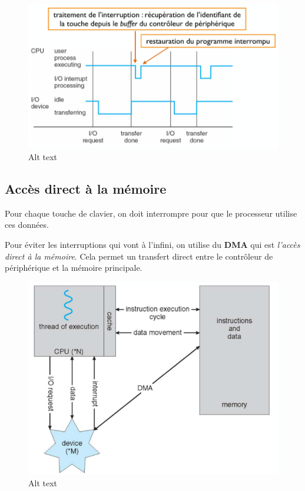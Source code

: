 \begin{figure}
\centering
\includegraphics{image.png}
\caption{Alt text}
\end{figure}

\subsection{Accès direct à la
mémoire}\label{accuxe8s-direct-uxe0-la-muxe9moire}

Pour chaque touche de clavier, on doit interrompre pour que le
processeur utilise ces données.

Pour éviter les interruptions qui vont à l'infini, on utilise du
\textbf{DMA} qui est \emph{l'accès direct à la mémoire}. Cela permet un
transfert direct entre le contrôleur de périphérique et la mémoire
principale.

\begin{figure}
\centering
\includegraphics{image-1.png}
\caption{Alt text}
\end{figure}

